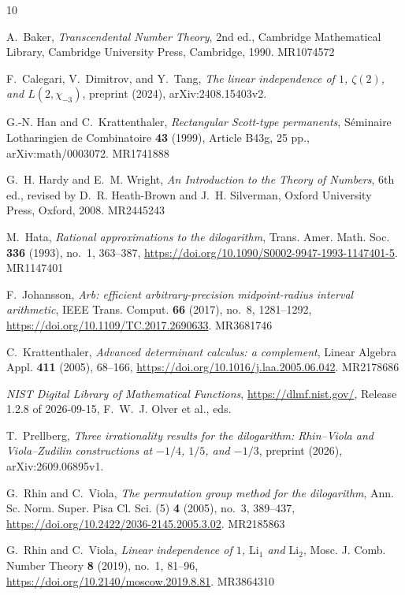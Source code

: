 \documentclass{amsart}
\numberwithin{equation}{section}
\numberwithin{table}{section}
\begin{document}
\begin{thebibliography}{10}

A.~Baker, \emph{Transcendental Number Theory}, 2nd ed., Cambridge Mathematical
Library, Cambridge University Press, Cambridge, 1990. MR1074572

F.~Calegari, V.~Dimitrov, and Y.~Tang, \emph{The linear independence of $1$,
$\zeta(2)$, and $L(2,\chi_{-3})$}, preprint (2024), arXiv:2408.15403v2.

G.-N. Han and C.~Krattenthaler, \emph{Rectangular Scott-type permanents},
S\'eminaire Lotharingien de Combinatoire \textbf{43} (1999), Article B43g,
25 pp., arXiv:math/0003072. MR1741888

G.~H. Hardy and E.~M. Wright, \emph{An Introduction to the Theory of
Numbers}, 6th ed., revised by D.~R. Heath-Brown and J.~H. Silverman,
Oxford University Press, Oxford, 2008. MR2445243

M.~Hata, \emph{Rational approximations to the dilogarithm}, Trans. Amer. Math.
Soc. \textbf{336} (1993), no.~1, 363--387,
\url{https://doi.org/10.1090/S0002-9947-1993-1147401-5}. MR1147401

F.~Johansson, \emph{Arb: efficient arbitrary-precision midpoint-radius
interval arithmetic}, IEEE Trans. Comput. \textbf{66} (2017), no.~8,
1281--1292, \url{https://doi.org/10.1109/TC.2017.2690633}. MR3681746

C.~Krattenthaler, \emph{Advanced determinant calculus: a complement},
Linear Algebra Appl. \textbf{411} (2005), 68--166,
\url{https://doi.org/10.1016/j.laa.2005.06.042}. MR2178686

\emph{NIST Digital Library of Mathematical Functions},
\url{https://dlmf.nist.gov/}, Release 1.2.8 of 2026-09-15, F.~W.~J. Olver
et al., eds.

T.~Prellberg, \emph{Three irrationality results for the dilogarithm:
Rhin--Viola and Viola--Zudilin constructions at $-1/4$, $1/5$, and $-1/3$},
preprint (2026), arXiv:2609.06895v1.

G.~Rhin and C.~Viola, \emph{The permutation group method for the dilogarithm},
Ann. Sc. Norm. Super. Pisa Cl. Sci. (5) \textbf{4} (2005), no.~3, 389--437,
\url{https://doi.org/10.2422/2036-2145.2005.3.02}. MR2185863

G.~Rhin and C.~Viola, \emph{Linear independence of $1$, $\mathrm{Li}_1$ and
$\mathrm{Li}_2$}, Mosc. J. Comb. Number Theory \textbf{8} (2019), no.~1,
81--96,
\url{https://doi.org/10.2140/moscow.2019.8.81}. MR3864310


\end{thebibliography}
\end{document}
